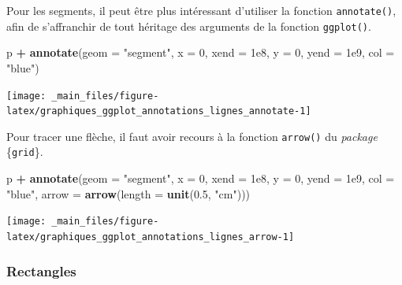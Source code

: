 \documentclass[
  11pt,
]{book}
\newenvironment{Shaded}{\begin{snugshade}}{\end{snugshade}}
\newcommand{\DataTypeTok}[1]{\textcolor[rgb]{0.13,0.29,0.53}{#1}}
\newcommand{\DecValTok}[1]{\textcolor[rgb]{0.00,0.00,0.81}{#1}}
\newcommand{\FloatTok}[1]{\textcolor[rgb]{0.00,0.00,0.81}{#1}}
\newcommand{\KeywordTok}[1]{\textcolor[rgb]{0.13,0.29,0.53}{\textbf{#1}}}
\newcommand{\NormalTok}[1]{#1}
\newcommand{\OperatorTok}[1]{\textcolor[rgb]{0.81,0.36,0.00}{\textbf{#1}}}
\newcommand{\StringTok}[1]{\textcolor[rgb]{0.31,0.60,0.02}{#1}}
\numberwithin{equation}{section}
\numberwithin{countremarque}{section}
\begin{document}
Pour les segments, il peut être plus intéressant d'utiliser la fonction \texttt{annotate()}, afin de s'affranchir de tout héritage des arguments de la fonction \texttt{ggplot()}.

\begin{Shaded}
\begin{Highlighting}[]
\NormalTok{p }\OperatorTok{+}\StringTok{ }\KeywordTok{annotate}\NormalTok{(}\DataTypeTok{geom =} \StringTok{"segment"}\NormalTok{,}
             \DataTypeTok{x =} \DecValTok{0}\NormalTok{, }\DataTypeTok{xend =} \FloatTok{1e8}\NormalTok{,}
             \DataTypeTok{y =} \DecValTok{0}\NormalTok{, }\DataTypeTok{yend =} \FloatTok{1e9}\NormalTok{, }\DataTypeTok{col =} \StringTok{"blue"}\NormalTok{)}
\end{Highlighting}
\end{Shaded}

\begin{center}\texttt{[image: \_main\_files/figure-latex/graphiques\_ggplot\_annotations\_lignes\_annotate-1]} \end{center}

Pour tracer une flèche, il faut avoir recours à la fonction \texttt{arrow()} du \emph{package} \{\texttt{grid}\}.

\begin{Shaded}
\begin{Highlighting}[]
\NormalTok{p }\OperatorTok{+}\StringTok{ }\KeywordTok{annotate}\NormalTok{(}\DataTypeTok{geom =} \StringTok{"segment"}\NormalTok{, }\DataTypeTok{x =} \DecValTok{0}\NormalTok{, }\DataTypeTok{xend =} \FloatTok{1e8}\NormalTok{,}
             \DataTypeTok{y =} \DecValTok{0}\NormalTok{, }\DataTypeTok{yend =} \FloatTok{1e9}\NormalTok{, }\DataTypeTok{col =} \StringTok{"blue"}\NormalTok{,}
             \DataTypeTok{arrow =} \KeywordTok{arrow}\NormalTok{(}\DataTypeTok{length =} \KeywordTok{unit}\NormalTok{(}\FloatTok{0.5}\NormalTok{, }\StringTok{"cm"}\NormalTok{)))}
\end{Highlighting}
\end{Shaded}

\begin{center}\texttt{[image: \_main\_files/figure-latex/graphiques\_ggplot\_annotations\_lignes\_arrow-1]} \end{center}

\hypertarget{graphiques_ggplot_annotations_rect}{%
\subsubsection{Rectangles}\label{graphiques_ggplot_annotations_rect}}
\end{document}
